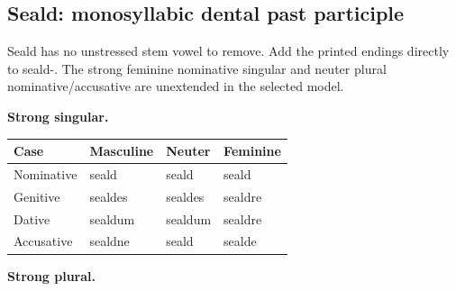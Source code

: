 \subsection*{Seald: monosyllabic dental past participle}

Seald has no unstressed stem vowel to remove. Add the printed endings directly to seald-. The strong feminine nominative singular and neuter plural nominative/\allowbreak{}accusative are unextended in the selected model.

\textbf{Strong singular.}

\par\begingroup
\fontsize{10.5}{13.2}\selectfont
\setlength{\LTleft}{0pt}\setlength{\LTright}{\fill}
\noindent
\begin{tabular}{@{}>{\raggedright\arraybackslash}p{22.0mm}>{\raggedright\arraybackslash}p{31.188mm}>{\raggedright\arraybackslash}p{31.188mm}>{\raggedright\arraybackslash}p{31.188mm}@{}}
\toprule
\textbf{Case} & \textbf{Masculine} & \textbf{Neuter} & \textbf{Feminine} \\
\midrule
Nominative & seald & seald & seald \\
Genitive & sealdes & sealdes & sealdre \\
Dative & sealdum & sealdum & sealdre \\
Accusative & sealdne & seald & sealde \\
\bottomrule
\end{tabular}
\par\endgroup
\textbf{Strong plural.}

